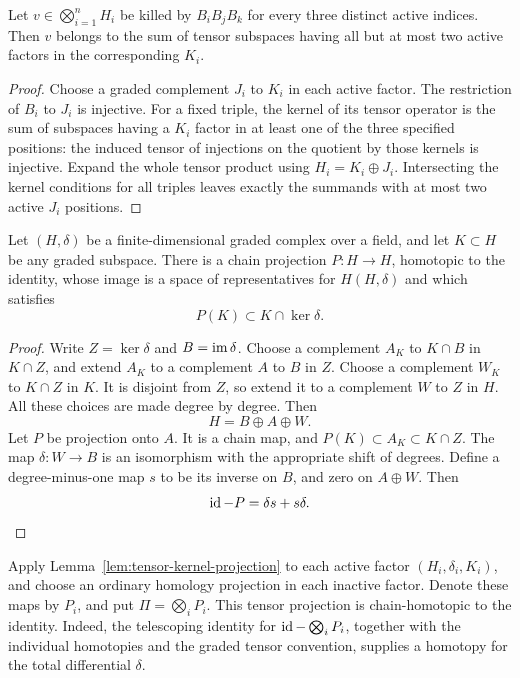 \begin{lemma}\label{lem:tensor-kernel-support}
Let \(v\in\bigotimes_{i=1}^nH_i\) be killed by
\(B_iB_jB_k\) for every three distinct active indices.
Then \(v\) belongs to the sum of tensor subspaces having all but at most
two active factors in the corresponding \(K_i\).
\end{lemma}

\begin{proof}
Choose a graded complement \(J_i\) to \(K_i\) in each active factor.
The restriction of \(B_i\) to \(J_i\) is injective.
For a fixed triple, the kernel of its tensor operator is the sum of
subspaces having a \(K_i\) factor in at least one of the three specified
positions: the induced tensor of injections on the quotient by those
kernels is injective.
Expand the whole tensor product using \(H_i=K_i\oplus J_i\).
Intersecting the kernel conditions for all triples leaves exactly the
summands with at most two active \(J_i\) positions.
\end{proof}

\begin{lemma}
\label{lem:tensor-kernel-projection}
Let \((H,\delta)\) be a finite-dimensional graded complex over a field,
and let \(K\subset H\) be any graded subspace.
There is a chain projection \(P:H\to H\), homotopic to the identity,
whose image is a space of representatives for \(H(H,\delta)\) and which
satisfies
\[
                    P(K)\subset K\cap\ker\delta .
\]
\end{lemma}

\begin{proof}
Write \(Z=\ker\delta\) and \(B=\operatorname{im}\delta\).
Choose a complement \(A_K\) to \(K\cap B\) in \(K\cap Z\), and extend
\(A_K\) to a complement \(A\) to \(B\) in \(Z\).
Choose a complement \(W_K\) to \(K\cap Z\) in \(K\).
It is disjoint from \(Z\), so extend it to a complement \(W\) to \(Z\)
in \(H\).  All these choices are made degree by degree.
Then
\[
                       H=B\oplus A\oplus W .
\]
Let \(P\) be projection onto \(A\).  It is a chain map, and
\(P(K)\subset A_K\subset K\cap Z\).
The map \(\delta:W\to B\) is an isomorphism with the appropriate shift
of degrees.  Define a degree-minus-one map \(s\) to be its inverse on
\(B\), and zero on \(A\oplus W\).  Then
\[
                        \operatorname{id}-P=\delta s+s\delta .
\]
\end{proof}

Apply Lemma~\ref{lem:tensor-kernel-projection} to each active factor
\((H_i,\delta_i,K_i)\), and choose an ordinary homology projection in
each inactive factor.  Denote these maps by \(P_i\), and put
\(\Pi=\bigotimes_iP_i\).  This tensor projection is chain-homotopic
to the identity.  Indeed, the telescoping identity for
\(\operatorname{id}-\bigotimes_iP_i\), together with the individual homotopies and
the graded tensor convention, supplies a homotopy for the total
differential \(\delta\).

